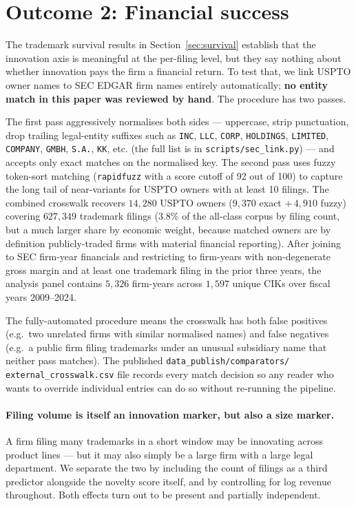 \documentclass[11pt]{article}
\begin{document}
\section{Outcome 2: Financial success}
\label{sec:financials}

The trademark survival results in Section~\ref{sec:survival} establish
that the innovation axis is meaningful at the per-filing level, but
they say nothing about whether innovation pays the firm a financial
return. To test that, we link USPTO owner names to SEC EDGAR firm
names entirely automatically; \textbf{no entity match in this paper
was reviewed by hand}. The procedure has two passes.

The first pass aggressively normalises both sides --- uppercase,
strip punctuation, drop trailing legal-entity suffixes such as
\texttt{INC}, \texttt{LLC}, \texttt{CORP}, \texttt{HOLDINGS},
\texttt{LIMITED}, \texttt{COMPANY}, \texttt{GMBH}, \texttt{S.A.},
\texttt{KK}, etc. (the full list is in
\texttt{scripts/sec\_link.py})  --- and accepts only exact matches
on the normalised key. The second pass uses fuzzy token-sort
matching (\texttt{rapidfuzz} with a score cutoff of 92 out of 100)
to capture the long tail of near-variants for USPTO owners with at
least 10 filings. The combined crosswalk recovers $14{,}280$ USPTO
owners ($9{,}370$ exact $+\,4{,}910$ fuzzy) covering $627{,}349$
trademark filings ($3.8\%$ of the all-class corpus by filing count,
but a much larger share by economic weight, because matched owners
are by definition publicly-traded firms with material financial
reporting). After joining to SEC firm-year financials and
restricting to firm-years with non-degenerate gross margin and at
least one trademark filing in the prior three years, the analysis
panel contains $5{,}326$ firm-years across $1{,}597$ unique CIKs
over fiscal years 2009--2024.

The fully-automated procedure means the crosswalk has both
false positives (e.g.\ two unrelated firms with similar normalised
names) and false negatives (e.g.\ a public firm filing
trademarks under an unusual subsidiary name that neither pass
matches). The published \texttt{data\_publish/comparators/
external\_crosswalk.csv} file records every match decision so any
reader who wants to override individual entries can do so without
re-running the pipeline.

\paragraph{Filing volume is itself an innovation marker, but also a
size marker.} A firm filing many trademarks in a short window may be
innovating across product lines --- but it may also simply be a large
firm with a large legal department. We separate the two by including
the count of filings as a third predictor alongside the novelty score
itself, and by controlling for log revenue throughout. Both effects
turn out to be present and partially independent.
\end{document}
